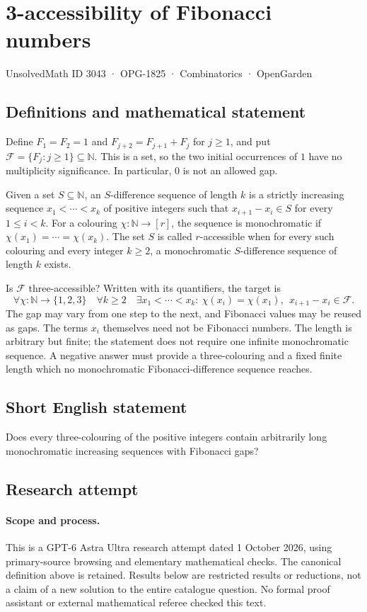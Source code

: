 \documentclass[11pt,a4paper]{article}
\begin{document}
\section*{3-accessibility of Fibonacci numbers}\label{3043}
{\small UnsolvedMath ID 3043 · OPG-1825 · Combinatorics · OpenGarden}
\subsection{Definitions and mathematical statement}
Define $F_1=F_2=1$ and $F_{j+2}=F_{j+1}+F_j$ for $j\ge1$, and put
$\mathcal F=\{F_j:j\ge1\}\subseteq\mathbb N$. This is a set, so the two
initial occurrences of $1$ have no multiplicity significance. In particular,
$0$ is not an allowed gap.

Given a set $S\subseteq\mathbb N$, an $S$-difference sequence of length
$k$ is a strictly increasing sequence $x_1<\cdots<x_k$ of positive integers
such that $x_{i+1}-x_i\in S$ for every $1\le i<k$.
For a colouring $\chi:\mathbb N\to[r]$, the sequence is monochromatic if
$\chi(x_1)=\cdots=\chi(x_k)$. The set $S$ is called $r$-accessible when
for every such colouring and every integer $k\ge2$, a monochromatic
$S$-difference sequence of length $k$ exists.

Is $\mathcal F$ three-accessible? Written with its quantifiers, the target is
\[
 \forall\chi:\mathbb N\to\{1,2,3\}\quad\forall k\ge2\quad
 \exists x_1<\cdots<x_k:
 \ \chi(x_i)=\chi(x_1),\ \ x_{i+1}-x_i\in\mathcal F.
\]
The gap may vary from one step to the next, and Fibonacci values may be
reused as gaps. The terms $x_i$ themselves need not be Fibonacci numbers.
The length is arbitrary but finite; the statement does not require one
infinite monochromatic sequence. A negative answer must provide a
three-colouring and a fixed finite length which no monochromatic
Fibonacci-difference sequence reaches.
\subsection{Short English statement}
Does every three-colouring of the positive integers contain arbitrarily long monochromatic increasing sequences with Fibonacci gaps?
\subsection{Research attempt}
\paragraph{Scope and process.}
This is a GPT-6 Astra Ultra research attempt dated 1 October 2026, using
primary-source browsing and elementary mathematical checks. The canonical
definition above is retained. Results below are restricted results or
reductions, not a claim of a new solution to the entire catalogue question.
No formal proof assistant or external mathematical referee checked this text.
\end{document}
